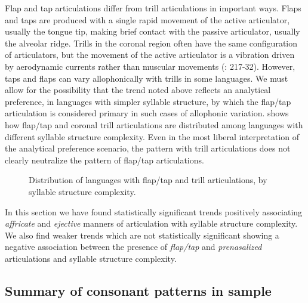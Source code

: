   Flap and tap articulations differ from trill articulations in important ways. Flaps and taps are produced with a single rapid movement of the active articulator, usually the tongue tip, making brief contact with the passive articulator, usually the alveolar ridge. Trills in the coronal region often have the same configuration of articulators, but the movement of the active articulator is a vibration driven by aerodynamic currents rather than muscular movements (\citealt{LadefogedMaddieson1996}: 217-32). However, taps and flaps can vary allophonically with trills in some languages. We must allow for the possibility that the trend noted above reflects an analytical preference, in languages with simpler syllable structure, by which the flap/tap articulation is considered primary in such cases of allophonic variation.  shows how flap/tap and coronal trill articulations are distributed among languages with different syllable structure complexity. Even in the most liberal interpretation of the analytical preference scenario, the pattern with trill articulations does not clearly neutralize the pattern of flap/tap articulations.

\begin{figure}
\caption{\label{fig:4.17} Distribution of languages with flap/tap and trill articulations, by syllable structure complexity.}
\end{figure}

  In this section we have found statistically significant trends positively associating \textit{affricate} and \textit{ejective} manners of articulation with syllable structure complexity. We also find weaker trends which are not statistically significant showing a negative association between the presence of \textit{flap/tap} and \textit{prenasalized} articulations and syllable structure complexity.

\subsection{Summary of consonant patterns in sample}\label{sec:4.4.6}

